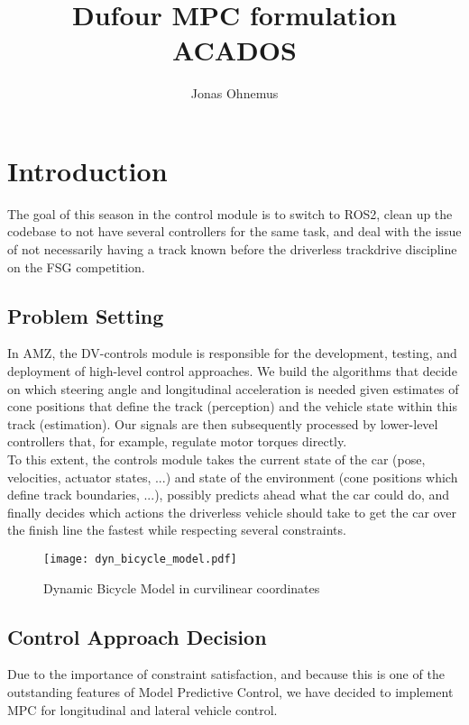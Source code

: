 \documentclass[
a4paper, %
10pt, %
notitlepage,
english]{CSUniSchoolLabReport}
\title{Dufour MPC formulation \\ ACADOS}
\author{Jonas Ohnemus}
\begin{document}
\maketitle

{\let\clearpage\relax \vspace{100pt}\tableofcontents}
\newpage

\chapter{Introduction}

The goal of this season in the control module is to switch to ROS2, clean up the codebase to not have several controllers for the same task, and deal with the issue of not necessarily having a track known before the driverless trackdrive discipline on the FSG competition.

\section{Problem Setting}

In AMZ, the DV-controls module is responsible for the development, testing, and deployment of high-level control approaches. We build the algorithms that decide on which steering angle and longitudinal acceleration is needed given estimates of cone positions that define the track (perception) and the vehicle state within this track (estimation). Our signals are then subsequently processed by lower-level controllers that, for example, regulate motor torques directly.\\
To this extent, the controls module takes the current state of the car (pose, velocities, actuator states, ...) and state of the environment (cone positions which define track boundaries, ...), possibly predicts ahead what the car could do, and finally decides which actions the driverless vehicle should take to get the car over the finish line the fastest while respecting several constraints.

\begin{figure}[H]
	\centering
	\texttt{[image: dyn\_bicycle\_model.pdf]}
	\caption{Dynamic Bicycle Model in curvilinear coordinates}
\end{figure}

\section{Control Approach Decision}

Due to the importance of constraint satisfaction, and because this is one of the outstanding features of Model Predictive Control, we have decided to implement MPC for longitudinal and lateral vehicle control.
\end{document}
